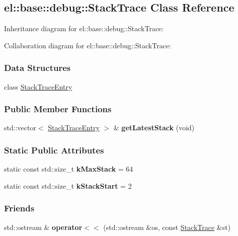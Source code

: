 \hypertarget{a00082}{}\subsection{el\+:\+:base\+:\+:debug\+:\+:Stack\+Trace Class Reference}
\label{a00082}


Inheritance diagram for el\+:\+:base\+:\+:debug\+:\+:Stack\+Trace\+:


Collaboration diagram for el\+:\+:base\+:\+:debug\+:\+:Stack\+Trace\+:
\subsubsection*{Data Structures}
\begin{DoxyCompactItemize}
\item 
class \hyperlink{a00083}{Stack\+Trace\+Entry}
\end{DoxyCompactItemize}
\subsubsection*{Public Member Functions}
\begin{DoxyCompactItemize}
\item 
\hypertarget{a00082_a8b6a4f154b59d597b73fe8a515df3240}{}std\+::vector$<$ \hyperlink{a00083}{Stack\+Trace\+Entry} $>$ \& {\bfseries get\+Latest\+Stack} (void)\label{a00082_a8b6a4f154b59d597b73fe8a515df3240}

\end{DoxyCompactItemize}
\subsubsection*{Static Public Attributes}
\begin{DoxyCompactItemize}
\item 
\hypertarget{a00082_a6e3db7fdc258a7d653f00fc5aade55c2}{}static const std\+::size\+\_\+t {\bfseries k\+Max\+Stack} = 64\label{a00082_a6e3db7fdc258a7d653f00fc5aade55c2}

\item 
\hypertarget{a00082_ab8a89fe5c4f779d3e685a5e61f1136e2}{}static const std\+::size\+\_\+t {\bfseries k\+Stack\+Start} = 2\label{a00082_ab8a89fe5c4f779d3e685a5e61f1136e2}

\end{DoxyCompactItemize}
\subsubsection*{Friends}
\begin{DoxyCompactItemize}
\item 
\hypertarget{a00082_a3b8e978df331fbe725e2a39d031355cc}{}std\+::ostream \& {\bfseries operator$<$$<$} (std\+::ostream \&os, const \hyperlink{a00082}{Stack\+Trace} \&st)\label{a00082_a3b8e978df331fbe725e2a39d031355cc}

\end{DoxyCompactItemize}
